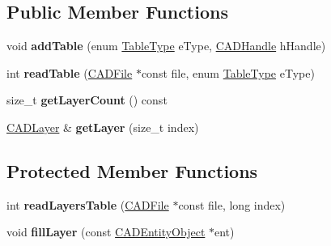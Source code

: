 \subsection*{Public Member Functions}
\begin{DoxyCompactItemize}
\item 
void {\bfseries add\+Table} (enum \hyperlink{class_c_a_d_tables_a83b3acba13e77ca6961fcc4a2b85ddb5}{Table\+Type} e\+Type, \hyperlink{class_c_a_d_handle}{C\+A\+D\+Handle} h\+Handle)\hypertarget{class_c_a_d_tables_ace15042d80d5aef41150dd3230646e40}{}\label{class_c_a_d_tables_ace15042d80d5aef41150dd3230646e40}

\item 
int {\bfseries read\+Table} (\hyperlink{class_c_a_d_file}{C\+A\+D\+File} $\ast$const file, enum \hyperlink{class_c_a_d_tables_a83b3acba13e77ca6961fcc4a2b85ddb5}{Table\+Type} e\+Type)\hypertarget{class_c_a_d_tables_afce1da87a965970b97749000bb914292}{}\label{class_c_a_d_tables_afce1da87a965970b97749000bb914292}

\item 
size\+\_\+t {\bfseries get\+Layer\+Count} () const \hypertarget{class_c_a_d_tables_ac82dab510143ea234d0cdfa1dcc47631}{}\label{class_c_a_d_tables_ac82dab510143ea234d0cdfa1dcc47631}

\item 
\hyperlink{class_c_a_d_layer}{C\+A\+D\+Layer} \& {\bfseries get\+Layer} (size\+\_\+t index)\hypertarget{class_c_a_d_tables_a03068ffaec5d5d1846e9fe9aaafe4e49}{}\label{class_c_a_d_tables_a03068ffaec5d5d1846e9fe9aaafe4e49}

\end{DoxyCompactItemize}
\subsection*{Protected Member Functions}
\begin{DoxyCompactItemize}
\item 
int {\bfseries read\+Layers\+Table} (\hyperlink{class_c_a_d_file}{C\+A\+D\+File} $\ast$const file, long index)\hypertarget{class_c_a_d_tables_a087cdffd84ad8ae898557de06eb8fa28}{}\label{class_c_a_d_tables_a087cdffd84ad8ae898557de06eb8fa28}

\item 
void {\bfseries fill\+Layer} (const \hyperlink{class_c_a_d_entity_object}{C\+A\+D\+Entity\+Object} $\ast$ent)\hypertarget{class_c_a_d_tables_acb7f241606c5059fb631bb8e9806b388}{}\label{class_c_a_d_tables_acb7f241606c5059fb631bb8e9806b388}

\end{DoxyCompactItemize}
